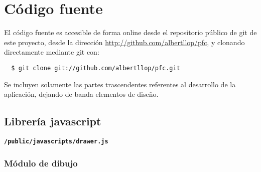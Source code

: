 \section{Código fuente} %
\label{sec:código_fuente}

El código fuente es accesible de forma online desde el repositorio público de git de este proyecto, desde la dirección \url{http://github.com/albertllop/pfc}, y clonando directamente mediante git con:

\begin{verbatim}
  $ git clone git://github.com/albertllop/pfc.git  
\end{verbatim}

Se incluyen solamente las partes trascendentes referentes al desarrollo de la aplicación, dejando de banda elementos de diseño.

\subsection{Librería javascript} %
\label{sub:librería_javascript}

\textbf{\texttt{/public/javascripts/drawer.js}}

\subsubsection{Módulo de dibujo} %
\label{ssub:módulo_de_dibujo}

